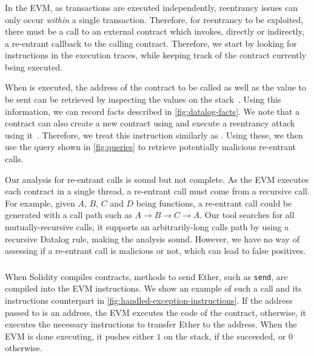 


\subsubsection{\reentrancy}
In the EVM, as transactions are executed independently, reentrancy issues can only occur \emph{within} a single transaction.
Therefore, for reentrancy to be exploited, there must be a call to an external contract which invokes, directly or indirectly, a re-entrant callback to the calling contract.
Therefore, we start by looking for  instructions in the execution traces, while keeping track of the contract currently being executed.

When  is executed, the address of the contract to be called as well as the value to be sent can be retrieved by inspecting the values on the stack~\cite{wood2014ethereum}. Using this information, we can record  facts described in \autoref{fig:datalog-facts}.
We note that a contract can also create a new contract using  and execute a reentrancy attack using it~\cite{Rodler2019}.
Therefore, we treat this instruction similarly as .
Using these, we then use the query shown in \autoref{fig:queries} to retrieve potentially malicious re-entrant calls.

\correctness Our analysis for re-entrant calls is sound but not complete. As the EVM executes each contract in a single thread, a re-entrant call must come from a recursive call. For example, given $A$, $B$, $C$ and $D$ being functions, a re-entrant call could be generated with a call path such as $A\rightarrow B \rightarrow C\rightarrow A$. Our tool searches for all mutually-recursive calls; it supports an arbitrarily-long calls path by using a recursive Datalog rule, making the analysis sound. However, we have no way of assessing if a re-entrant call is malicious or not, which can lead to false positives.

\subsubsection{\unhandledexceptions}
%
When Solidity compiles contracts, methods to send Ether, such as \lstinline{send}, are compiled into the EVM  instructions. We show an example of such a call and its instructions counterpart in \autoref{fig:handled-exception-instructions}.
If the address passed to  is an address, the EVM executes the code of the contract, otherwise, it executes the necessary instructions to transfer Ether to the address. When the EVM is done executing, it pushes either $1$ on the stack, if the  succeeded, or $0$ otherwise. 

